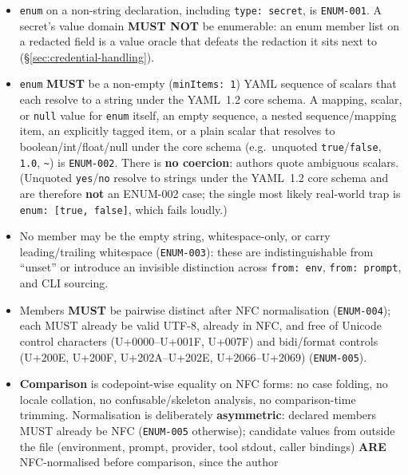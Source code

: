 \begin{itemize}
  \item \texttt{enum} on a non-string declaration, including
        \texttt{type: secret}, is \texttt{ENUM-001}. A secret's value domain
        \textbf{MUST NOT} be enumerable: an enum member list on a redacted
        field is a value oracle that defeats the redaction it sits next to
        (\S\ref{sec:credential-handling}).
  \item \texttt{enum} \textbf{MUST} be a non-empty (\texttt{minItems: 1})
        YAML sequence of scalars that each resolve to a string under the
        YAML~1.2 core schema. A mapping, scalar, or \texttt{null} value for
        \texttt{enum} itself, an empty sequence, a nested
        sequence/mapping item, an explicitly tagged item, or a plain scalar
        that resolves to boolean/int/float/null under the core schema
        (e.g.\ unquoted \texttt{true}/\texttt{false}, \texttt{1.0},
        \texttt{\textasciitilde}) is \texttt{ENUM-002}. There
        is \textbf{no coercion}: authors quote ambiguous scalars. (Unquoted
        \texttt{yes}/\texttt{no} resolve to strings under the YAML~1.2 core
        schema and are therefore \textbf{not} an ENUM-002 case; the single
        most likely real-world trap is \texttt{enum: [true, false]}, which
        fails loudly.)
  \item No member may be the empty string, whitespace-only, or carry
        leading/trailing whitespace (\texttt{ENUM-003}): these are
        indistinguishable from ``unset'' or introduce an invisible
        distinction across \texttt{from: env}, \texttt{from: prompt}, and
        CLI sourcing.
  \item Members \textbf{MUST} be pairwise distinct after NFC normalisation
        (\texttt{ENUM-004}); each MUST already be valid UTF-8, already in
        NFC, and free of Unicode control characters (U+0000--U+001F,
        U+007F) and bidi/format controls (U+200E, U+200F, U+202A--U+202E,
        U+2066--U+2069) (\texttt{ENUM-005}).
  \item \textbf{Comparison} is codepoint-wise equality on NFC forms: no case
        folding, no locale collation, no confusable/skeleton analysis, no
        comparison-time trimming. Normalisation is deliberately
        \textbf{asymmetric}: declared members MUST already be NFC
        (\texttt{ENUM-005} otherwise); candidate values from outside the
        file (environment, prompt, provider, tool stdout, caller bindings)
        \textbf{ARE} NFC-normalised before comparison, since the author

\end{itemize}
